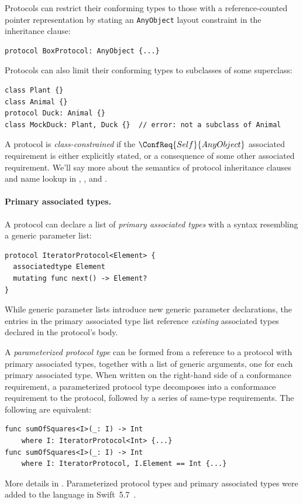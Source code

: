 \documentclass[../generics]{subfiles}
\begin{document}
Protocols can restrict their conforming types to those with a reference-counted pointer representation by stating an \texttt{AnyObject} layout constraint in the inheritance clause:
\begin{Verbatim}
protocol BoxProtocol: AnyObject {...}
\end{Verbatim}

Protocols can also limit their conforming types to subclasses of some superclass:
\begin{Verbatim}
class Plant {}
class Animal {}
protocol Duck: Animal {}
class MockDuck: Plant, Duck {}  // error: not a subclass of Animal
\end{Verbatim}
A protocol is \emph{class-constrained} if the $\ConfReq{Self}{AnyObject}$ associated requirement is either explicitly stated, or a consequence of some other associated requirement. We'll say more about the semantics of protocol inheritance clauses and name lookup in , , and .

\paragraph{Primary associated types.}
A protocol can declare a list of \emph{primary associated types} with a syntax resembling a generic parameter list:
\begin{Verbatim}
protocol IteratorProtocol<Element> {
  associatedtype Element
  mutating func next() -> Element?
}
\end{Verbatim}
While generic parameter lists introduce new generic parameter declarations, the entries in the primary associated type list reference \emph{existing} associated types declared in the protocol's body.

A \emph{parameterized protocol type} can be formed from a reference to a protocol with primary associated types, together with a list of generic arguments, one for each primary associated type. When written on the right-hand side of a conformance requirement, a parameterized protocol type decomposes into a conformance requirement to the protocol, followed by a series of same-type requirements. The following are equivalent:
\begin{Verbatim}
func sumOfSquares<I>(_: I) -> Int
    where I: IteratorProtocol<Int> {...}
func sumOfSquares<I>(_: I) -> Int
    where I: IteratorProtocol, I.Element == Int {...}
\end{Verbatim}
More details in . Parameterized protocol types and primary associated types were added to the language in Swift~5.7~\cite{se0346}. 
\end{document}
